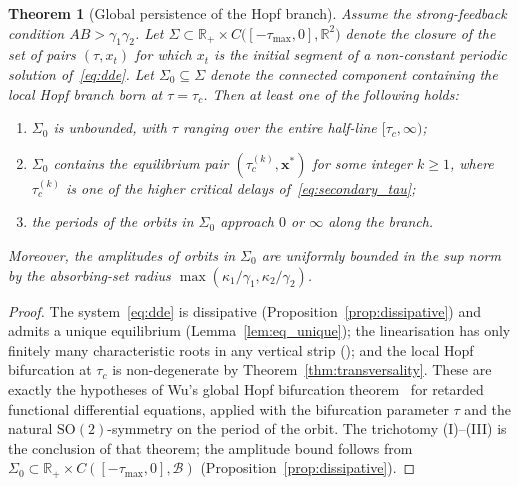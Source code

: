 \documentclass[sn-mathphys,Numbered]{sn-jnl}
\theoremstyle{thmstyleone}
\newtheorem{theorem}{Theorem}
\theoremstyle{thmstyletwo}
\theoremstyle{thmstylethree}
\begin{document}
\begin{theorem}[Global persistence of the Hopf branch]
\label{thm:global_hopf}
Assume the strong-feedback condition $AB>\gamma_1\gamma_2$. Let
$\Sigma\subset\mathbb{R}_{+}\times C\bigl([-\tau_{\max},0],\mathbb{R}^{2}\bigr)$
denote the closure of the set of pairs $(\tau,x_t)$ for which $x_t$ is
the initial segment of a non-constant periodic solution
of~\eqref{eq:dde}. Let $\Sigma_0\subseteq\Sigma$ denote the connected
component containing the local Hopf branch born at $\tau=\tau_c$. Then
at least one of the following holds:
\begin{enumerate}
  \item[\textnormal{(I)}] $\Sigma_0$ is unbounded, with $\tau$
        ranging over the entire half-line $[\tau_c,\infty)$;
  \item[\textnormal{(II)}] $\Sigma_0$ contains the equilibrium pair
        $(\tau_c^{(k)},\mathbf{x}^{*})$ for some integer
        $k\geq 1$, where $\tau_c^{(k)}$ is one of the higher critical
        delays of~\eqref{eq:secondary_tau};
  \item[\textnormal{(III)}] the periods of the orbits in $\Sigma_0$
        approach $0$ or $\infty$ along the branch.
\end{enumerate}
Moreover, the amplitudes of orbits in $\Sigma_0$ are uniformly bounded
in the sup norm by the absorbing-set radius
$\max(\kappa_1/\gamma_1,\kappa_2/\gamma_2)$.
\end{theorem}
\begin{proof}
The system~\eqref{eq:dde} is dissipative
(Proposition~\ref{prop:dissipative}) and admits a unique equilibrium
(Lemma~\ref{lem:eq_unique}); the linearisation has only finitely many
characteristic roots in any vertical strip
(\cite[Ch.~XI]{hale1993introduction}); and the local Hopf bifurcation
at $\tau_c$ is non-degenerate by Theorem~\ref{thm:transversality}. These
are exactly the hypotheses of Wu's global Hopf bifurcation
theorem~\cite[Theorem~3.3]{wu1998symmetric} for retarded functional
differential equations, applied with the bifurcation parameter $\tau$
and the natural $\mathrm{SO}(2)$-symmetry on the period of the orbit.
The trichotomy (I)--(III) is the conclusion of that theorem; the
amplitude bound follows from $\Sigma_0\subset\mathbb{R}_+\times
C([-\tau_{\max},0],\mathcal{B})$ (Proposition~\ref{prop:dissipative}).
\end{proof}
\end{document}
